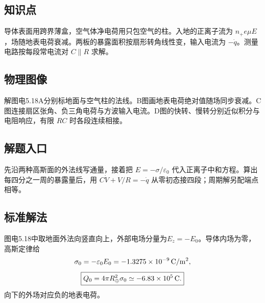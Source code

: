 \documentclass[UTF8,fontset=fandol,a4paper,11pt]{ctexart}
\begin{document}

\subsection*{知识点}

导体表面用跨界薄盒，空气体净电荷用只包空气的柱。入地的正离子流为 $n_+e\mu E$，场随地表电荷衰减。两板的暴露面积按扇形转角线性变，输入电流为 $-\dot q$。测量电路按每段常电流对 $C\parallel R$ 求解。



\subsection*{物理图像}

解图电5.18A分别标地面与空气柱的法线。B图画地表电荷绝对值随场同步衰减。C图连接扇区张角、负三角电荷与方波输入电流。D图的快转、慢转分别近似积分与电阻响应，有限 $RC$ 时各段连续相接。



\subsection*{解题入口}

先沿两种高斯面的外法线写通量，接着把 $E=-\sigma/\varepsilon_0$ 代入正离子中和方程。算出每四分之一周的暴露量后，用 $C\dot V+V/R=-\dot q$ 从零初态接四段；周期解另配端点相等。


\subsection*{标准解法}


图电5.18中取地面外法向竖直向上，外部电场分量为$E_z=-E_0$。导体内场为零，高斯定律给
\[
 \sigma_0=-\varepsilon_0E_0=-1.3275\times10^{-9}\,{\rm C/m^2},
\]
\[
 \boxed{Q_0=4\pi R_\oplus^2\sigma_0
 \simeq-6.83\times10^5\,{\rm C}.}
\]
向下的外场对应负的地表电荷。
\end{document}

